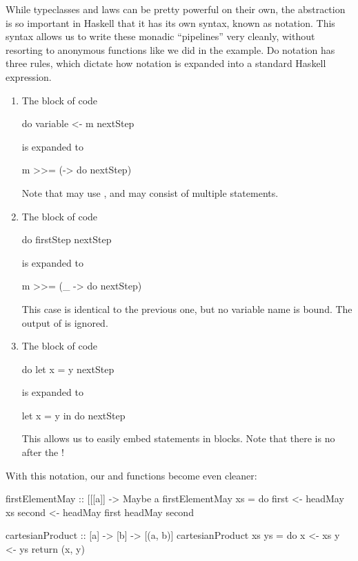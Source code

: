 While typeclasses and laws can be pretty powerful on their own, the  abstraction is so
important in Haskell that it has its own syntax, known as  notation. This syntax allows
us to write these monadic ``pipelines'' very cleanly, without resorting to anonymous functions like
we did in the  example. Do notation has three rules, which dictate how
 notation is expanded into a standard Haskell expression.
\begin{enumerate}
    \item The block of code
\begin{haskell}
do
  variable <- m
  nextStep
\end{haskell}
is expanded to
\begin{haskell}
m >>= (\variable -> do
  nextStep)
\end{haskell}
Note that  may use , and may consist of multiple statements.

    \item The block of code
\begin{haskell}
do
  firstStep
  nextStep
\end{haskell}
is expanded to
\begin{haskell}
m >>= (\_ -> do
  nextStep)
\end{haskell}
This case is identical to the previous one, but no variable name is bound. The output of 
is ignored.

    \item The block of code
\begin{haskell}
do
  let x = y
  nextStep
\end{haskell}
is expanded to
\begin{haskell}
let x = y in do
  nextStep
\end{haskell}
This allows us to easily embed  statements in  blocks. Note that there is no
 after the !
\end{enumerate}
With this notation, our  and  functions become even
cleaner:
\begin{haskell}
firstElementMay :: [[[a]] -> Maybe a
firstElementMay xs = do
  first <- headMay xs
  second <- headMay first
  headMay second

cartesianProduct :: [a] -> [b] -> [(a, b)]
cartesianProduct xs ys = do
  x <- xs
  y <- ys
  return (x, y)
\end{haskell}

